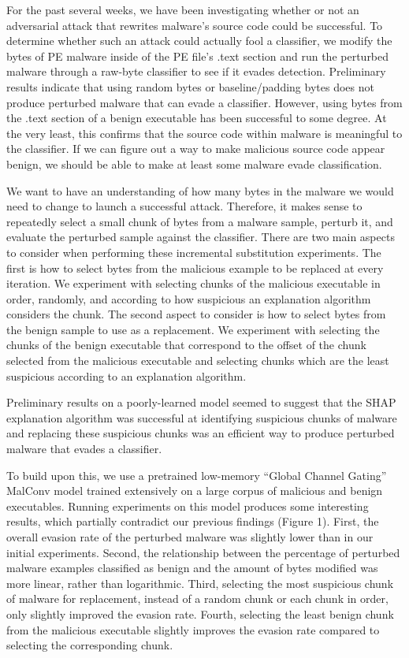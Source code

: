 \documentclass{article}
\begin{document}
For the past several weeks, we have been investigating whether or not an adversarial attack that rewrites malware's source code could be successful. To determine whether such an attack could actually fool a classifier, we modify the bytes of PE malware inside of the PE file's .text section and run the perturbed malware through a raw-byte classifier to see if it evades detection. Preliminary results indicate that using random bytes or baseline/padding bytes does not produce perturbed malware that can evade a classifier. However, using bytes from the .text section of a benign executable has been successful to some degree. At the very least, this confirms that the source code within malware is meaningful to the classifier. If we can figure out a way to make malicious source code appear benign, we should be able to make at least some malware evade classification.

We want to have an understanding of how many bytes in the malware we would need to change to launch a successful attack. Therefore, it makes sense to repeatedly select a small chunk of bytes from a malware sample, perturb it, and evaluate the perturbed sample against the classifier. There are two main aspects to consider when performing these incremental substitution experiments. The first is how to select bytes from the malicious example to be replaced at every iteration. We experiment with selecting chunks of the malicious executable in order, randomly, and according to how suspicious an explanation algorithm considers the chunk. The second aspect to consider is how to select bytes from the benign sample to use as a replacement. We experiment with selecting the chunks of the benign executable that correspond to the offset of the chunk selected from the malicious executable and selecting chunks which are the least suspicious according to an explanation algorithm.

Preliminary results on a poorly-learned model seemed to suggest that the SHAP explanation algorithm was successful at identifying suspicious chunks of malware and replacing these suspicious chunks was an efficient way to produce perturbed malware that evades a classifier.

To build upon this, we use a pretrained low-memory ``Global Channel Gating'' MalConv model trained extensively on a large corpus of malicious and benign executables. Running experiments on this model produces some interesting results, which partially contradict our previous findings (Figure 1). First, the overall evasion rate of the perturbed malware was slightly lower than in our initial experiments. Second, the relationship between the percentage of perturbed malware examples classified as benign and the amount of bytes modified was more linear, rather than logarithmic. Third, selecting the most suspicious chunk of malware for replacement, instead of a random chunk or each chunk in order, only slightly improved the evasion rate. Fourth, selecting the least benign chunk from the malicious executable slightly improves the evasion rate compared to selecting the corresponding chunk.
\end{document}
